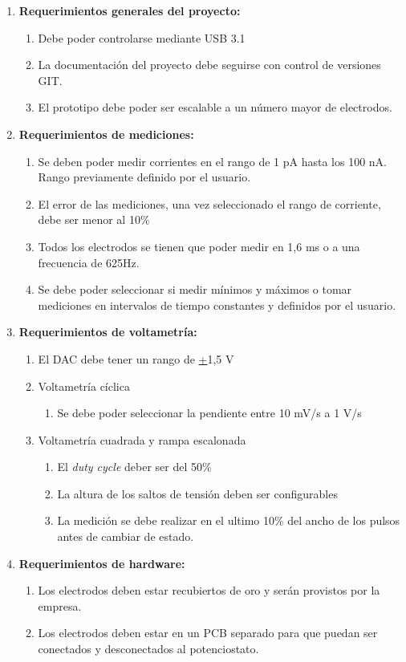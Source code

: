 \documentclass[11pt]{charter}
\begin{document}
\begin{enumerate}

\item \textbf{Requerimientos generales del proyecto:}
\begin{enumerate}
	\item Debe poder controlarse mediante USB 3.1
	\item La documentación del proyecto debe seguirse con control de versiones GIT.
	\item El prototipo debe poder ser escalable a un número mayor de electrodos.
\end{enumerate}

\item \textbf{Requerimientos de mediciones:}
\begin{enumerate}
	\item Se deben poder medir corrientes en el rango de 1 pA hasta los 100 nA. Rango previamente definido por el usuario.
	\item El error de las mediciones, una vez seleccionado el rango de corriente, debe ser menor al 10\%
	\item Todos los electrodos se tienen que poder medir en 1,6 ms o a una frecuencia de 625Hz.
	\item Se debe poder seleccionar si medir mínimos y máximos o tomar mediciones en intervalos de tiempo constantes y definidos por el usuario.
\end{enumerate}

\item \textbf{Requerimientos de voltametría:}
\begin{enumerate}
	\item El DAC debe tener un rango de \underline{+}1,5 V
	\item Voltametría cíclica
	\begin{enumerate}
		\item Se debe poder seleccionar la pendiente entre 10 mV/s a 1 V/s 
	\end{enumerate}
	\item Voltametría cuadrada y rampa escalonada
	\begin{enumerate}
		\item El \textit{duty cycle} deber ser del 50\%
		\item La altura de los saltos de tensión deben ser configurables
		\item La medición se debe realizar en el ultimo 10\% del ancho de los pulsos antes de cambiar de estado.
	\end{enumerate}
\end{enumerate}

\item \textbf{Requerimientos de hardware:}
\begin{enumerate}
	\item Los electrodos deben estar recubiertos de oro y serán provistos por la empresa.
	\item Los electrodos deben estar en un PCB separado para que puedan ser conectados y desconectados al potenciostato.
\end{enumerate}

\end{enumerate}
\end{document}
